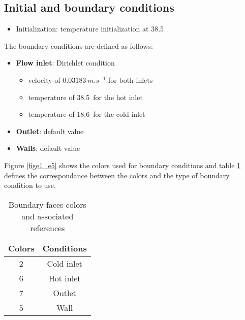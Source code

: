         \subsection{Initial and boundary conditions}

\begin{itemize}
\renewcommand{\labelitemi}{$\rightarrow$}
        \item Initialization: temperature initialization at 38.5\degresC
\end{itemize}

The boundary conditions are defined as follows:

\begin{itemize}
        \item {\bfseries Flow inlet}: Dirichlet condition
        \begin{itemize}
                \item velocity of $0.03183\ m.s^{-1}$ for both inlets
                \item temperature of 38.5\degresC\ for the hot inlet
                \item temperature of 18.6\degresC\ for the cold inlet
        \end{itemize}
        \item {\bfseries Outlet}: default value
        \item {\bfseries Walls}: default value
\end{itemize}

Figure \ref{fige1_e5} shows the colors used for boundary conditions and
table \ref{tabante51} defines the correspondance between the colors and
the type of boundary condition to use.

\begin{table}
\begin{center}
\begin{tabular}{|c|c|}
\hline
Colors & Conditions \\
\hline
2 & Cold inlet \\
\hline
6 & Hot inlet \\
\hline
7 & Outlet \\
\hline
5 & Wall \\
\hline
\end{tabular}
\caption{Boundary faces colors and associated references}
\label{tabante51}
\end{center}
\end{table}



